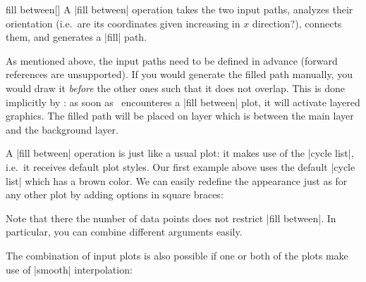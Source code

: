 \begin{addplotoperation}[]{fill between}{[]}
	A |fill between| operation takes the two input paths, analyzes their orientation (i.e.\ are its coordinates given increasing in $x$ direction?), connects them, and generates a |fill| path. 
	
	As mentioned above, the input paths need to be defined in advance (forward references are unsupported). If you would generate the filled path manually, you would draw it \emph{before} the other ones such that it does not overlap. This is done implicitly by \PGFPlots: as soon as \PGFPlots\ encounteres a |fill between| plot, it will activate layered graphics. The filled path will be placed on layer  which is between the main layer and the background layer.\label{Layer!pre main} 

	A |fill between| operation is just like a usual plot: it makes use of the |cycle list|, i.e.\ it receives default plot styles. Our first example above uses the default |cycle list| which has a brown color. We can easily redefine the appearance just as for any other plot by adding options in square braces:
\begin{codeexample}[]
\end{codeexample}

	Note that there the number of data points does not restrict |fill between|. In particular, you can combine different arguments easily.
\begin{codeexample}[]
\end{codeexample}

The combination of input plots is also possible if one or both of the plots make use of |smooth| interpolation:
\begin{codeexample}[]
\end{codeexample}
\end{addplotoperation}
